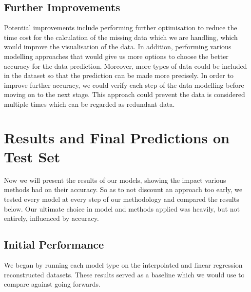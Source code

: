 \documentclass[8pt]{article}
\begin{document}
\subsection{Further Improvements}
Potential improvements include performing further optimisation to reduce the time cost for the calculation of the missing data which we are handling, which would improve the visualisation of the data. In addition, performing various modelling approaches that would give us more options to choose the better accuracy for the data prediction.
Moreover, more types of data could be included in the dataset so that the prediction can be made more precisely. In order to improve further accuracy, we could verify each step of the data modelling before moving on to the next stage. This approach could prevent the data is considered multiple times which can be regarded as redundant data.

\section{Results and Final Predictions on Test Set}
Now we will present the results of our models, showing the impact various methods had on their accuracy.
So as to not discount an approach too early, we tested every model at every step of our methodology and compared the results below.
Our ultimate choice in model and methods applied was heavily, but not entirely, influenced by accuracy.

\subsection{Initial Performance}
We began by running each model type on the interpolated and linear regression reconstructed datasets. These results served as a baseline which we would use to compare against going forwards.
\end{document}
